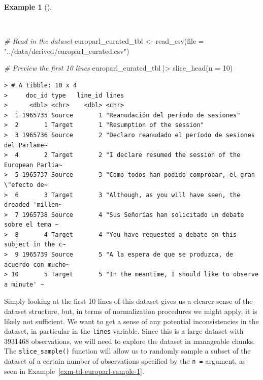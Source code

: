 \documentclass[
  letterpaper,
  DIV=11,
  numbers=noendperiod]{scrreport}
\newenvironment{Shaded}{\begin{snugshade}}{\end{snugshade}}
\newcommand{\AttributeTok}[1]{\textcolor[rgb]{0.00,0.00,0.00}{#1}}
\newcommand{\CommentTok}[1]{\textcolor[rgb]{0.00,0.00,0.00}{\textit{#1}}}
\newcommand{\DecValTok}[1]{\textcolor[rgb]{0.00,0.00,0.00}{#1}}
\newcommand{\FunctionTok}[1]{\textcolor[rgb]{0.00,0.00,0.00}{#1}}
\newcommand{\NormalTok}[1]{\textcolor[rgb]{0.00,0.00,0.00}{#1}}
\newcommand{\OtherTok}[1]{\textcolor[rgb]{0.00,0.00,0.00}{#1}}
\newcommand{\SpecialCharTok}[1]{\textcolor[rgb]{0.00,0.00,0.00}{#1}}
\newcommand{\StringTok}[1]{\textcolor[rgb]{0.00,0.00,0.00}{#1}}
\theoremstyle{definition}
\newtheorem{example}{Example}[chapter]
\theoremstyle{remark}
\begin{document}
\begin{example}[]\protect\hypertarget{exm-tb-europarl-preview}{}\label{exm-tb-europarl-preview}

~

\begin{Shaded}
\begin{Highlighting}[]
\CommentTok{\# Read in the dataset}
\NormalTok{europarl\_curated\_tbl }\OtherTok{\textless{}{-}}
  \FunctionTok{read\_csv}\NormalTok{(}\AttributeTok{file =} \StringTok{"../data/derived/europarl\_curated.csv"}\NormalTok{)}

\CommentTok{\# Preview the first 10 lines}
\NormalTok{europarl\_curated\_tbl }\SpecialCharTok{|\textgreater{}}
  \FunctionTok{slice\_head}\NormalTok{(}\AttributeTok{n =} \DecValTok{10}\NormalTok{)}
\end{Highlighting}
\end{Shaded}

\begin{verbatim}
> # A tibble: 10 x 4
>     doc_id type   line_id lines                                                 
>      <dbl> <chr>    <dbl> <chr>                                                 
>  1 1965735 Source       1 "Reanudación del período de sesiones"                 
>  2       1 Target       1 "Resumption of the session"                           
>  3 1965736 Source       2 "Declaro reanudado el período de sesiones del Parlame~
>  4       2 Target       2 "I declare resumed the session of the European Parlia~
>  5 1965737 Source       3 "Como todos han podido comprobar, el gran \"efecto de~
>  6       3 Target       3 "Although, as you will have seen, the dreaded 'millen~
>  7 1965738 Source       4 "Sus Señorías han solicitado un debate sobre el tema ~
>  8       4 Target       4 "You have requested a debate on this subject in the c~
>  9 1965739 Source       5 "A la espera de que se produzca, de acuerdo con mucho~
> 10       5 Target       5 "In the meantime, I should like to observe a minute' ~
\end{verbatim}

\end{example}

Simply looking at the first 10 lines of this dataset gives us a clearer
sense of the dataset structure, but, in terms of normalization
procedures we might apply, it is likely not sufficient. We want to get a
sense of any potential inconsistencies in the dataset, in particular in
the \texttt{lines} variable. Since this is a large dataset with 3931468
observations, we will need to explore the dataset in manageable chunks.
The \texttt{slice\_sample()} function will allow us to randomly sample a
subset of the dataset of a certain number of observations specified by
the \texttt{n\ =} argument, as seen in
Example~\ref{exm-td-europarl-sample-1}.
\end{document}
